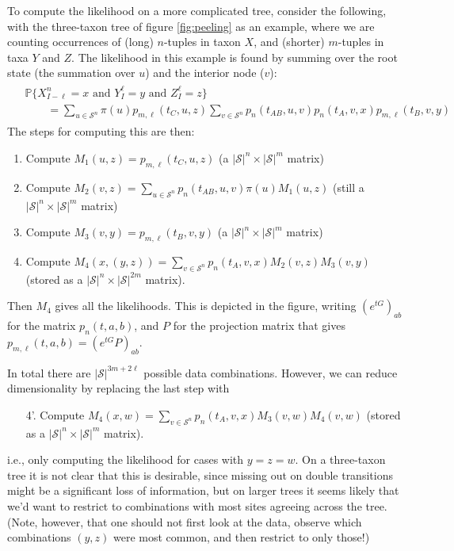 \documentclass{article}
\renewcommand{\P}{\mathbb{P}}
\newcommand{\calS}{\mathcal{S}}  %
\theoremstyle{plain}
\theoremstyle{definition}
\begin{document}
To compute the likelihood on a more complicated tree, consider the following,
with the three-taxon tree of figure \ref{fig:peeling} as an example,
where we are counting occurrences of (long) $n$-tuples in taxon $X$,
and (shorter) $m$-tuples in taxa $Y$ and $Z$.
The likelihood in this example is found by summing over the root state (the summation over $u$)
and the interior node ($v$):
\begin{align} \label{eqn:three_taxa_likelihood}
  \begin{split}
    & \P\{X_{I-\ell}^{n}=x \text{ and } Y_I^\ell=y \text{ and } Z_I^\ell=z \} \\
    &\qquad = \sum_{u \in \calS^{n}} \pi(u) p_{m,\ell}(t_C,u,z) \sum_{v \in \calS^{n}} p_{n}(t_{AB},u,v) p_{n}(t_{A},v,x) p_{m,\ell}(t_B,v,y)
  \end{split}
\end{align}
The steps for computing this are then:
\begin{enumerate}

  \item Compute $M_1(u,z) = p_{m,\ell}(t_C,u,z)$ (a $|\calS|^{n} \times |\calS|^m$ matrix)

  \item Compute $M_2(v,z) = \sum_{u \in \calS^{n}}  p_{n}(t_{AB},u,v) \pi(u) M_1(u,z)$ (still a $|\calS|^{n} \times |\calS|^m$ matrix)

  \item Compute $M_3(v,y) = p_{m,\ell}(t_B,v,y)$ (a $|\calS|^{n} \times |\calS|^m$ matrix)

  \item Compute $M_4(x,(y,z)) = \sum_{v \in \calS^{n}} p_{n}(t_{A},v,x) M_2(v,z) M_3(v,y)$ (stored as a $|\calS|^{n} \times |\calS|^{2m}$ matrix).

\end{enumerate}
Then $M_4$ gives all the likelihoods.
This is depicted in the figure, writing $\left(e^{tG}\right)_{ab}$ for the matrix $p_{n}(t,a,b)$,
and $P$ for the projection matrix that gives $p_{m,\ell}(t,a,b) = \left( e^{tG} P\right)_{ab}$.


In total there are $|\calS|^{3m+2\ell}$ possible data combinations.
However, we can reduce dimensionality by replacing the last step with
\begin{enumerate}

  \item[4'.] Compute $M_4(x,w) = \sum_{v \in \calS^{n}} p_{n}(t_{A},v,x) M_3(v,w) M_4(v,w)$ (stored as a $|\calS|^{n} \times |\calS|^{m}$ matrix).

\end{enumerate}
i.e., only computing the likelihood for cases with $y=z=w$.
On a three-taxon tree it is not clear that this is desirable, since missing out on double transitions
might be a significant loss of information,
but on larger trees it seems likely that we'd want to restrict to combinations with most sites agreeing across the tree.
(Note, however, that one should not first look at the data, observe which combinations $(y,z)$ were most common, and then restrict to only those!)
\end{document}
